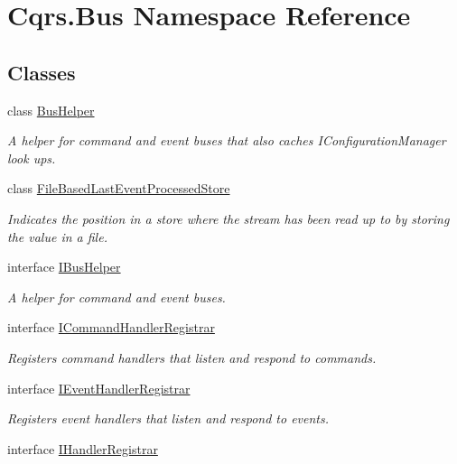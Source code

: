 \hypertarget{namespaceCqrs_1_1Bus}{}\section{Cqrs.\+Bus Namespace Reference}
\label{namespaceCqrs_1_1Bus}
\subsection*{Classes}
\begin{DoxyCompactItemize}
\item 
class \hyperlink{classCqrs_1_1Bus_1_1BusHelper}{Bus\+Helper}
\begin{DoxyCompactList}\small\item\em A helper for command and event buses that also caches I\+Configuration\+Manager look ups. \end{DoxyCompactList}\item 
class \hyperlink{classCqrs_1_1Bus_1_1FileBasedLastEventProcessedStore}{File\+Based\+Last\+Event\+Processed\+Store}
\begin{DoxyCompactList}\small\item\em Indicates the position in a store where the stream has been read up to by storing the value in a file. \end{DoxyCompactList}\item 
interface \hyperlink{interfaceCqrs_1_1Bus_1_1IBusHelper}{I\+Bus\+Helper}
\begin{DoxyCompactList}\small\item\em A helper for command and event buses. \end{DoxyCompactList}\item 
interface \hyperlink{interfaceCqrs_1_1Bus_1_1ICommandHandlerRegistrar}{I\+Command\+Handler\+Registrar}
\begin{DoxyCompactList}\small\item\em Registers command handlers that listen and respond to commands. \end{DoxyCompactList}\item 
interface \hyperlink{interfaceCqrs_1_1Bus_1_1IEventHandlerRegistrar}{I\+Event\+Handler\+Registrar}
\begin{DoxyCompactList}\small\item\em Registers event handlers that listen and respond to events. \end{DoxyCompactList}\item 
interface \hyperlink{interfaceCqrs_1_1Bus_1_1IHandlerRegistrar}{I\+Handler\+Registrar}

\end{DoxyCompactItemize}
